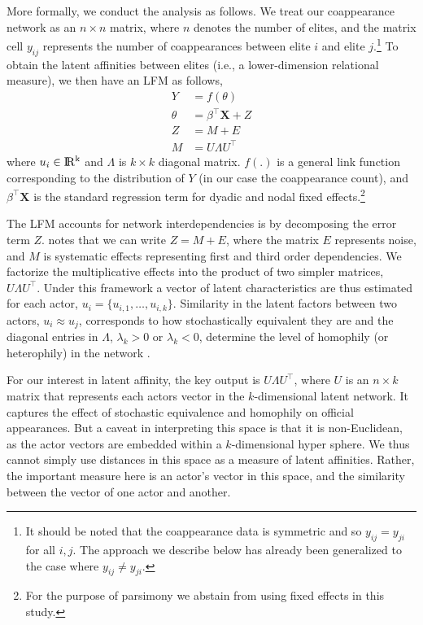 \documentclass[11pt,english]{article}
\begin{document}
\begin{flushleft}
More formally, we conduct the analysis as follows. We treat our coappearance network as an $n\times n$ matrix, where $n$ denotes the number of elites, and the matrix cell $y_{ij}$ represents the number of coappearances between elite $i$ and elite $j$.\footnote{It should be noted that the coappearance data is symmetric and so $y_{ij}=y_{ji}$ for all $i,j$. The approach we describe below has already been generalized to the case where $y_{ij}\neq y_{ji}$.} To obtain the latent affinities between elites (i.e., a lower-dimension relational measure), we then have an LFM as follows,
\begin{align}
Y & =f(\theta)\\
\theta & =\beta^{\top}\mathbf{X}+Z\\
Z & =M+E\\
M & =U\Lambda U^{\top}
\end{align}
where $u_{i}\in{\rm I\!R^{k}}$ and $\Lambda$ is $k\times k$ diagonal matrix. $f(.)$ is a general link function corresponding to the distribution of $Y$ (in our case the coappearance count), and $\beta^{\top}\mathbf{X}$ is the standard regression term for dyadic and nodal fixed effects.\footnote{For the purpose of parsimony we abstain from using fixed effects in this study.}

The LFM accounts for network interdependencies is by decomposing the error term $Z$. \citet{Hoff2008} notes that we can write $Z=M+E$, where the matrix $E$ represents noise, and $M$ is systematic effects representing first and third order dependencies. We factorize the multiplicative effects into the product of two simpler matrices, $U\Lambda U^{\top}$. Under this framework a vector of latent characteristics are thus estimated for each actor, $u_{i}=\{u_{i,1},\ldots,u_{i,k}\}$. Similarity in the latent factors between two actors, $u_{i}\approx u_{j}$, corresponds to how stochastically equivalent they are and the diagonal entries in $\Lambda$, $\lambda_{k}>0$ or $\lambda_{k}<0$, determine the level of homophily (or heterophily) in the network \citep{Minhas2016a}.

For our interest in latent affinity, the key output is $U\Lambda U^{\top}$, where $U$ is an $n\times k$ matrix that represents each actors vector in the $k$-dimensional latent network. It captures the effect of stochastic equivalence and homophily on official appearances. But a caveat in interpreting this space is that it is non-Euclidean, as the actor vectors are embedded within a $k$-dimensional hyper sphere. We thus cannot simply use distances in this space as a measure of latent affinities. Rather, the important measure here is an actor's vector in this space, and the similarity between the vector of one actor and another.


\end{flushleft}
\end{document}
